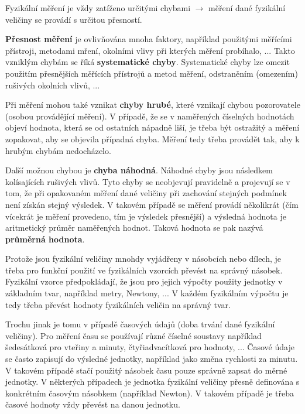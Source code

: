 Fyzikální měření je vždy zatíženo určitými chybami $\rightarrow$ měření dané fyzikální veličiny se provádí s určitou přesností. 

{\bf Přesnost měření} je ovlivňována mnoha faktory, například použitými měřícími přístroji, metodami mření, okolními vlivy při kterých měření probíhalo, ... Takto vzniklým chybám se říká {\bf systematické chyby}. Systematické chyby lze omezit použitím přesnějších měřících přístrojů a metod měření, odstraněním (omezením) rušivých okolních vlivů, ...

Při měření mohou také vznikat {\bf chyby hrubé}, které vznikají chybou pozorovatele (osobou provádějící měření). V případě, že se v naměřených číselných hodnotách objeví hodnota, která se od ostatních nápadně liší, je třeba být ostražitý a měření zopakovat, aby se objevila případná chyba. Měření tedy třeba provádět tak, aby k hrubým chybám nedocházelo.

Další možnou chybou je {\bf chyba náhodná}. Náhodné chyby jsou následkem kolísajících rušivých vlivů. Tyto chyby se neobjevují pravidelně a projevují se v tom, že při opakovaném měření dané veličiny při zachování stejných podmínek není získán stejný výsledek. V takovém případě se měření provádí několikrát (čím vícekrát je měření provedeno, tím je výsledek přesnější) a výsledná hodnota je aritmetický průměr naměřených hodnot. Taková hodnota se pak nazývá {\bf průměrná hodnota}.


Protože jsou fyzikální veličiny mnohdy vyjádřeny v násobcích nebo dílech, je třeba pro funkční použití ve fyzikálních vzorcích převést na správný násobek. Fyzikální vzorce předpokládají, že jsou pro jejich výpočty použity jednotky v základním tvar, například metry, Newtony, ... V každém fyzikálním výpočtu je tedy třeba převést hodnoty fyzikálních veličin na správný tvar.

Trochu jinak je tomu v případě časových údajů (doba trvání dané fyzikální veličiny). Pro měření času se používají různé číselné soustavy například šedesátková pro vteřiny a minuty, čtyřiadvacítková pro hodnoty, ... Časové údaje se často zapisují do výsledné jednotky, například jako změna rychlosti za minutu. V takovém případě stačí použitý násobek času pouze správně zapsat do měrné jednotky. V některých případech je jednotka fyzikální veličiny přesně definována s konkrétním časovým násobkem (například Newton). V takovém případě je třeba časové hodnoty vždy převést na danou jednotku. 

